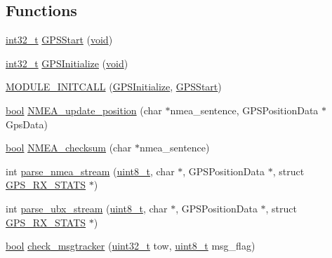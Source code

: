 \subsection*{Functions}
\begin{DoxyCompactItemize}
\item 
\hyperlink{group___n_a_m_e_gafd12020da5a235dfcf0c3c748fb5baed}{int32\-\_\-t} \hyperlink{group___g_s_p_module_ga8050cbef253d91ff25e0df5f1633a96f}{G\-P\-S\-Start} (\hyperlink{group___n_a_m_e_ga18028b8badbf1ea7e704ccac3c488e82}{void})
\item 
\hyperlink{group___n_a_m_e_gafd12020da5a235dfcf0c3c748fb5baed}{int32\-\_\-t} \hyperlink{group___g_s_p_module_gaaa9e652434fef66adb2ea7721f3ad640}{G\-P\-S\-Initialize} (\hyperlink{group___n_a_m_e_ga18028b8badbf1ea7e704ccac3c488e82}{void})
\item 
\hyperlink{group___g_s_p_module_ga26eba01dd90e72f58587731e20e8dc57}{M\-O\-D\-U\-L\-E\-\_\-\-I\-N\-I\-T\-C\-A\-L\-L} (\hyperlink{group___g_s_p_module_gaaa9e652434fef66adb2ea7721f3ad640}{G\-P\-S\-Initialize}, \hyperlink{group___g_s_p_module_ga8050cbef253d91ff25e0df5f1633a96f}{G\-P\-S\-Start})
\item 
\hyperlink{group___exported__types_gaf6a258d8f3ee5206d682d799316314b1}{bool} \hyperlink{group___g_s_p_module_gafb07ad2b755c0395ac8d7f6e86965c44}{N\-M\-E\-A\-\_\-update\-\_\-position} (char $\ast$nmea\-\_\-sentence, G\-P\-S\-Position\-Data $\ast$Gps\-Data)
\item 
\hyperlink{group___exported__types_gaf6a258d8f3ee5206d682d799316314b1}{bool} \hyperlink{group___g_s_p_module_ga5f520a9c350e8e1d1425e655b651cf14}{N\-M\-E\-A\-\_\-checksum} (char $\ast$nmea\-\_\-sentence)
\item 
int \hyperlink{group___g_s_p_module_ga0e248cf833b5f3723e388822f1552aa5}{parse\-\_\-nmea\-\_\-stream} (\hyperlink{stdint_8h_aba7bc1797add20fe3efdf37ced1182c5}{uint8\-\_\-t}, char $\ast$, G\-P\-S\-Position\-Data $\ast$, struct \hyperlink{struct_g_p_s___r_x___s_t_a_t_s}{G\-P\-S\-\_\-\-R\-X\-\_\-\-S\-T\-A\-T\-S} $\ast$)
\item 
int \hyperlink{group___g_s_p_module_ga88dff12629e2c3266f00a05836b67758}{parse\-\_\-ubx\-\_\-stream} (\hyperlink{stdint_8h_aba7bc1797add20fe3efdf37ced1182c5}{uint8\-\_\-t}, char $\ast$, G\-P\-S\-Position\-Data $\ast$, struct \hyperlink{struct_g_p_s___r_x___s_t_a_t_s}{G\-P\-S\-\_\-\-R\-X\-\_\-\-S\-T\-A\-T\-S} $\ast$)
\item 
\hyperlink{group___exported__types_gaf6a258d8f3ee5206d682d799316314b1}{bool} \hyperlink{group___g_s_p_module_gae7fdef747a5bfe514633f6925b6ffedf}{check\-\_\-msgtracker} (\hyperlink{stdint_8h_a435d1572bf3f880d55459d9805097f62}{uint32\-\_\-t} tow, \hyperlink{stdint_8h_aba7bc1797add20fe3efdf37ced1182c5}{uint8\-\_\-t} msg\-\_\-flag)
\end{DoxyCompactItemize}
